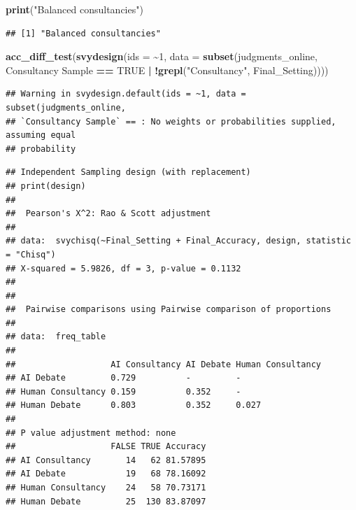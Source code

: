 \documentclass[
]{article}
\newenvironment{Shaded}{\begin{snugshade}}{\end{snugshade}}
\newcommand{\AttributeTok}[1]{\textcolor[rgb]{0.13,0.29,0.53}{#1}}
\newcommand{\ConstantTok}[1]{\textcolor[rgb]{0.56,0.35,0.01}{#1}}
\newcommand{\DecValTok}[1]{\textcolor[rgb]{0.00,0.00,0.81}{#1}}
\newcommand{\FunctionTok}[1]{\textcolor[rgb]{0.13,0.29,0.53}{\textbf{#1}}}
\newcommand{\NormalTok}[1]{#1}
\newcommand{\SpecialCharTok}[1]{\textcolor[rgb]{0.81,0.36,0.00}{\textbf{#1}}}
\newcommand{\StringTok}[1]{\textcolor[rgb]{0.31,0.60,0.02}{#1}}
\begin{document}
\begin{Shaded}
\begin{Highlighting}[]
\FunctionTok{print}\NormalTok{(}\StringTok{"Balanced consultancies"}\NormalTok{)}
\end{Highlighting}
\end{Shaded}

\begin{verbatim}
## [1] "Balanced consultancies"
\end{verbatim}

\begin{Shaded}
\begin{Highlighting}[]
\FunctionTok{acc\_diff\_test}\NormalTok{(}\FunctionTok{svydesign}\NormalTok{(}\AttributeTok{ids =} \SpecialCharTok{\textasciitilde{}}\DecValTok{1}\NormalTok{, }\AttributeTok{data =} \FunctionTok{subset}\NormalTok{(judgments\_online, }\StringTok{\textasciigrave{}}\AttributeTok{Consultancy Sample}\StringTok{\textasciigrave{}} \SpecialCharTok{==} \ConstantTok{TRUE} \SpecialCharTok{|} \SpecialCharTok{!}\FunctionTok{grepl}\NormalTok{(}\StringTok{"Consultancy"}\NormalTok{, Final\_Setting))))}
\end{Highlighting}
\end{Shaded}

\begin{verbatim}
## Warning in svydesign.default(ids = ~1, data = subset(judgments_online,
## `Consultancy Sample` == : No weights or probabilities supplied, assuming equal
## probability
\end{verbatim}

\begin{verbatim}
## Independent Sampling design (with replacement)
## print(design)
## 
##  Pearson's X^2: Rao & Scott adjustment
## 
## data:  svychisq(~Final_Setting + Final_Accuracy, design, statistic = "Chisq")
## X-squared = 5.9826, df = 3, p-value = 0.1132
## 
## 
##  Pairwise comparisons using Pairwise comparison of proportions 
## 
## data:  freq_table 
## 
##                   AI Consultancy AI Debate Human Consultancy
## AI Debate         0.729          -         -                
## Human Consultancy 0.159          0.352     -                
## Human Debate      0.803          0.352     0.027            
## 
## P value adjustment method: none 
##                   FALSE TRUE Accuracy
## AI Consultancy       14   62 81.57895
## AI Debate            19   68 78.16092
## Human Consultancy    24   58 70.73171
## Human Debate         25  130 83.87097
\end{verbatim}
\end{document}
